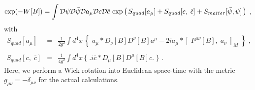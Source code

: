 \documentclass[a4paper,12pt]{article}
\begin{document}
%
\begin{eqnarray}
\exp(-W[B]) = 
\int {\cal D}\psi {\cal D}\bar{\psi}{\cal D}a_{\mu} {\cal D}c {\cal D}\bar{c}
\,\exp \left( \,
S_{quad}[a_{\mu}] + S_{quad}[c, \; \bar{c}] + S_{matter}[\bar{\psi}, \psi] 
\, \right)\;,
\end{eqnarray}
%
with 
%
%
\begin{eqnarray}
S_{quad}[a_{\mu}] \!\!&=&\!\! \frac{1}{2g^{2}} \int d^{4}x \,
\left\{\; a_{\mu} \ast D_{\nu}[B]D^{\nu}[B] a^{\mu}    
-2i a_{\mu} \ast [\; F^{\mu\nu}[B], \; a_{\nu} \;]_{M} \; \right\} \;, \\
& & \nonumber \\
S_{quad}[c, \; \bar{c}]  \!\!&=&\!\! \frac{1}{4g^{2}} \int d^{4}x \,
\biggl\{\; \biggr. i\bar{c} \ast D_{\mu}[B]D^{\mu}[B] c 
\biggl. \; \biggr\} \;.
\end{eqnarray}
%
Here, we perform a Wick rotation into Euclidean space-time with the metric 
$g_{\mu\nu}=-\delta_{\mu\nu}$ for the actual calculations. 
\end{document}
